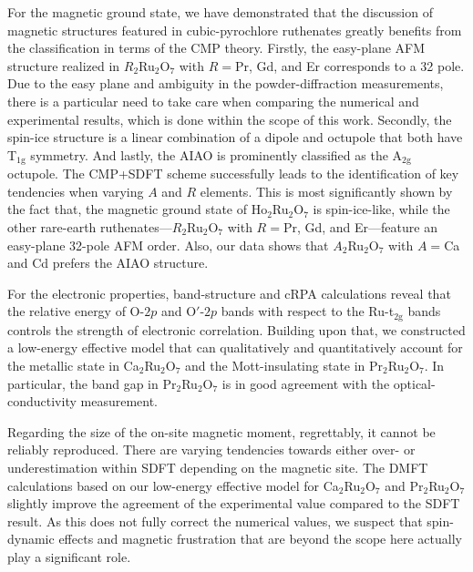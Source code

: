 \documentclass[10pt]{iopart}
\newcommand{\ttwog}{t$_{2\mathrm{g}}$ }
\begin{document}
For the magnetic ground state, we have demonstrated that the discussion of magnetic structures featured in cubic-pyrochlore ruthenates greatly benefits from the classification in terms of the CMP theory. Firstly, the easy-plane AFM structure realized in $R_2$Ru$_2$O$_7$ with $R=$Pr, Gd, and Er corresponds to a 32 pole. Due to the easy plane and ambiguity in the powder-diffraction measurements, there is a particular need to take care when comparing the numerical and experimental results, which is done within the scope of this work. Secondly, the spin-ice structure is a linear combination of a dipole and octupole that both have T$_{1\mathrm{g}}$ symmetry. 
And lastly, the AIAO is prominently classified as the A$_{2\mathrm{g}}$ octupole. The CMP+SDFT scheme successfully leads to the identification of key tendencies when varying $A$ and $R$ elements. This is most significantly shown by the fact that, the magnetic ground state of Ho$_2$Ru$_2$O$_7$ is spin-ice-like, while the other rare-earth ruthenates---$R_2$Ru$_2$O$_7$ with $R=$Pr, Gd, and Er---feature an easy-plane 32-pole AFM order. Also, our data shows that $A_2$Ru$_2$O$_7$ with $A=$Ca and Cd prefers the AIAO structure.

For the electronic properties, band-structure and cRPA calculations reveal that the relative energy of O-$2p$ and O$'$-$2p$ bands with respect to the Ru-\ttwog bands controls the strength of electronic correlation. Building upon that, we constructed a low-energy effective model that can qualitatively and quantitatively account for the metallic state in Ca$_2$Ru$_2$O$_7$ and the Mott-insulating state in Pr$_2$Ru$_2$O$_7$. In particular, the band gap in Pr$_2$Ru$_2$O$_7$ is in good agreement with the optical-conductivity measurement.

Regarding the size of the on-site magnetic moment, regrettably,
it cannot be reliably reproduced. There are varying tendencies towards either over- or underestimation within SDFT depending on the magnetic site. The DMFT calculations based on our low-energy effective model for Ca$_2$Ru$_2$O$_7$ and Pr$_2$Ru$_2$O$_7$ slightly improve the agreement of the experimental value compared to the SDFT result. As this does not fully correct the numerical values, we suspect that spin-dynamic effects and magnetic frustration that are beyond the scope here actually play a significant role.
\end{document}

